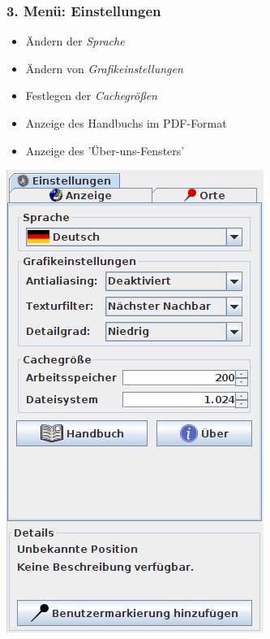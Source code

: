 \documentclass[10pt]{scrreprt}
\newcommand{\textref}[1]{\mbox{\raisebox{0.1ex}{\small$\rightarrow$ }\textit{#1}}}
\begin{document}
\newpage
\begin{minipage}[t]{9cm}
\vspace{-40mm}
\subsubsection{3. Menü: Einstellungen}  
	\begin{itemize}
	\item Ändern der \textref{Sprache}  
	\item Ändern von \textref{Grafikeinstellungen} 
	\item Festlegen der \textref{Cachegrößen} 
	\item Anzeige des Handbuchs im PDF-Format
	\item Anzeige des 'Über-uns-Fensters'
	\end{itemize}
\end{minipage}
\begin{minipage}{7cm}
\centering
\includegraphics[scale=0.4]{images/einstellungen_tab_DE.png}
\end{minipage}
\end{document}
